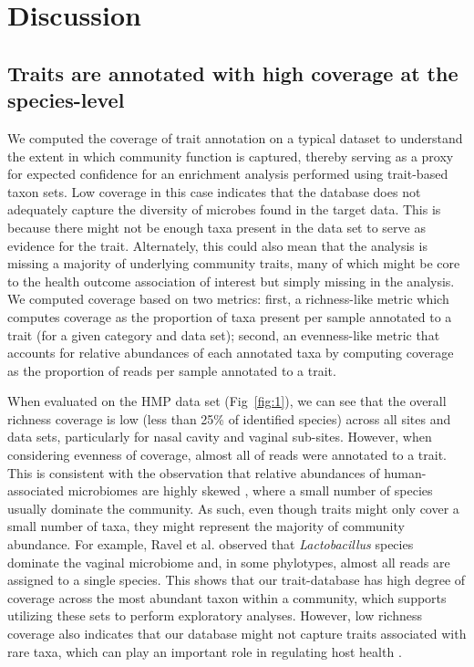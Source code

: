 \documentclass[10pt,letterpaper]{article}
\begin{document}
\section*{Discussion}
\subsection*{Traits are annotated with high coverage at the species-level}

We computed the coverage of trait annotation on a typical dataset to understand the extent in which community function is captured, thereby serving as a proxy for expected confidence for an enrichment analysis performed using trait-based taxon sets. Low coverage in this case indicates that the database does not adequately capture the diversity of microbes found in the target data. This is because there might not be enough taxa present in the data set to serve as evidence for the trait. Alternately, this could also mean that the analysis is missing a majority of underlying community traits, many of which might be core to the health outcome association of interest but simply missing in the analysis. We computed coverage based on two metrics: first, a richness-like metric which computes coverage as the proportion of taxa present per sample annotated to a trait (for a given category and data set); second, an evenness-like metric that accounts for relative abundances of each annotated taxa by computing coverage as the proportion of reads per sample annotated to a trait.

When evaluated on the HMP data set (Fig~\ref{fig:1}), we can see that the overall richness coverage is low (less than 25\% of identified species) across all sites and data sets, particularly for nasal cavity and vaginal sub-sites. However, when considering evenness of coverage, almost all of reads were annotated to a trait. This is consistent with the observation that relative abundances of human-associated microbiomes are highly skewed \cite{consortium2012structure}, where a small number of species usually dominate the community. As such, even though traits might only cover a small number of taxa, they might represent the majority of community abundance. For example, Ravel et al. \cite{ravel2011vaginal} observed that \emph{Lactobacillus} species dominate the vaginal microbiome and, in some phylotypes, almost all reads are assigned to a single species. This shows that our trait-database has high degree of coverage across the most abundant taxon within a community, which supports utilizing these sets to perform exploratory analyses. However, low richness coverage also indicates that our database might not capture traits associated with rare taxa, which can play an important role in regulating host health \cite{velazquez2019endogenous}.
\end{document}
